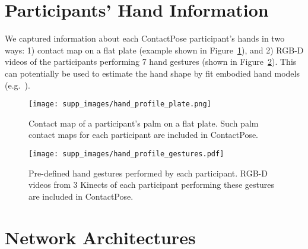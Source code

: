 \documentclass[runningheads]{llncs}
\begin{document}
\begin{table}
    \centering
    \caption{Statistics for hand-object penetration showing the accuracy of ContactPose. Note that \cite{learningJointReconstructionOfHandsAndManipulatedObjects} report \emph{joint} penetration for \cite{FHAD_FirstPersonAction}, while we report \emph{surface} penetration.}
    \label{tab:penetration_stats}
\end{table} \section{Participants' Hand Information}
We captured information about each ContactPose participant's hands in two ways: 1) contact map on a flat plate (example shown in Figure~\ref{fig:hand_profile_plate}), and 2) RGB-D videos of the participants performing 7 hand gestures (shown in Figure~\ref{fig:hand_profile_gestures}). This can potentially be used to estimate the hand shape by fit embodied hand models (e.g.~\cite{romero2017embodied}).

\begin{figure}[h!]
  \texttt{[image: supp\_images/hand\_profile\_plate.png]}
  \caption{Contact map of a participant's palm on a flat plate. Such palm contact maps for each participant are included in ContactPose.}
  \label{fig:hand_profile_plate}
\end{figure}

\begin{figure}[h!]
  \texttt{[image: supp\_images/hand\_profile\_gestures.pdf]}
  \caption{Pre-defined hand gestures performed by each participant. RGB-D videos from 3 Kinects of each participant performing these gestures are included in ContactPose.}
  \label{fig:hand_profile_gestures}
\end{figure} \section{Network Architectures}
\end{document}
